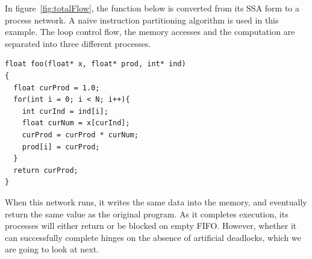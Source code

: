 \documentclass{sig-alternate}
\begin{document}
In figure~\ref{fig:totalFlow}, the function below is converted from its SSA form to a process network.  A naive instruction partitioning algorithm is used in this example. The loop control flow, the memory accesses and the computation are separated into three different
processes.

\begin{lstlisting}
float foo(float* x, float* prod, int* ind)
{
  float curProd = 1.0;
  for(int i = 0; i < N; i++){
    int curInd = ind[i];
    float curNum = x[curInd];
    curProd = curProd * curNum;
    prod[i] = curProd;
  }
  return curProd;
}
\end{lstlisting}
When this network runs, it writes the same data into the memory, and eventually return
the same value as the original program. As it completes execution, its processes will either return or be blocked on empty FIFO. However, whether it can successfully complete hinges on
the absence of artificial deadlocks, which we are going to look at next.
\end{document}
